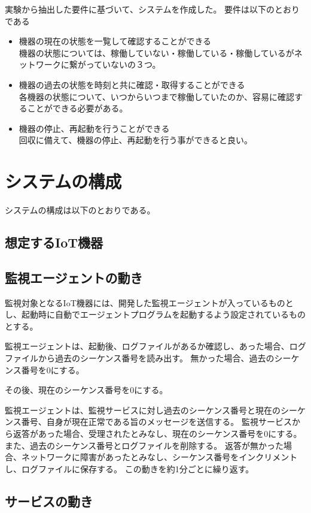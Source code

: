 実験から抽出した要件に基づいて、システムを作成した。
要件は以下のとおりである
\begin{itemize}
	\item 機器の現在の状態を一覧して確認することができる\\
		機器の状態については、稼働していない・稼働している・稼働しているがネットワークに繋がっていないの３つ。
	\item 機器の過去の状態を時刻と共に確認・取得することができる\\
		各機器の状態について、いつからいつまで稼働していたのか、容易に確認することができる必要がある。
	\item 機器の停止、再起動を行うことができる\\
		回収に備えて、機器の停止、再起動を行う事ができると良い。
\end{itemize}

\section{システムの構成}
システムの構成は以下のとおりである。
\subsection{想定するIoT機器}

\subsection{監視エージェントの動き}
監視対象となるIoT機器には、開発した監視エージェントが入っているものとし、起動時に自動でエージェントプログラムを起動するよう設定されているものとする。

監視エージェントは、起動後、ログファイルがあるか確認し、あった場合、ログファイルから過去のシーケンス番号を読み出す。
無かった場合、過去のシーケンス番号を0にする。

その後、現在のシーケンス番号を0にする。


監視エージェントは、監視サービスに対し過去のシーケンス番号と現在のシーケンス番号、自身が現在正常である旨のメッセージを送信する。
監視サービスから返答があった場合、受理されたとみなし、現在のシーケンス番号を0にする。
また、過去のシーケンス番号とログファイルを削除する。
返答が無かった場合、ネットワークに障害があったとみなし、シーケンス番号をインクリメントし、ログファイルに保存する。
この動きを約1分ごとに繰り返す。

\subsection{サービスの動き}
